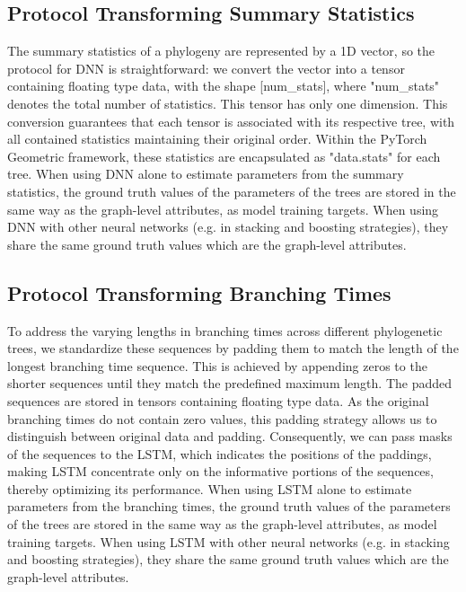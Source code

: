 {\subsection{Protocol Transforming Summary Statistics}
\label{sec::methods::data_transform::stats_dnn}
The summary statistics of a phylogeny are represented by a 1D vector, so the protocol for DNN is straightforward: we convert the vector into a tensor containing floating type data, with the shape [num\_stats], where "num\_stats" denotes the total number of statistics. This tensor has only one dimension. This conversion guarantees that each tensor is associated with its respective tree, with all contained statistics maintaining their original order. Within the PyTorch Geometric framework, these statistics are encapsulated as "data.stats" for each tree. When using DNN alone to estimate parameters from the summary statistics, the ground truth values of the parameters of the trees are stored in the same way as the graph-level attributes, as model training targets. When using DNN with other neural networks (e.g. in stacking and boosting strategies), they share the same ground truth values which are the graph-level attributes.

\subsection{Protocol Transforming Branching Times}
\label{sec::methods::data_transform::brts_lstm}
To address the varying lengths in branching times across different phylogenetic trees, we standardize these sequences by padding them to match the length of the longest branching time sequence. This is achieved by appending zeros to the shorter sequences until they match the predefined maximum length. The padded sequences are stored in tensors containing floating type data. As the original branching times do not contain zero values, this padding strategy allows us to distinguish between original data and padding. Consequently, we can pass masks of the sequences to the LSTM, which indicates the positions of the paddings, making LSTM concentrate only on the informative portions of the sequences, thereby optimizing its performance. When using LSTM alone to estimate parameters from the branching times, the ground truth values of the parameters of the trees are stored in the same way as the graph-level attributes, as model training targets. When using LSTM with other neural networks (e.g. in stacking and boosting strategies), they share the same ground truth values which are the graph-level attributes.

}
